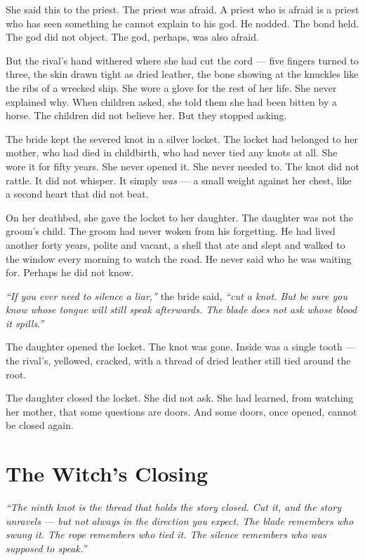 She said this to the priest. The priest was afraid. A priest who is afraid is a priest who has seen something he cannot explain to his god. He nodded. The bond held. The god did not object. The god, perhaps, was also afraid.

But the rival's hand withered where she had cut the cord — five fingers turned to three, the skin drawn tight as dried leather, the bone showing at the knuckles like the ribs of a wrecked ship. She wore a glove for the rest of her life. She never explained why. When children asked, she told them she had been bitten by a horse. The children did not believe her. But they stopped asking.

The bride kept the severed knot in a silver locket. The locket had belonged to her mother, who had died in childbirth, who had never tied any knots at all. She wore it for fifty years. She never opened it. She never needed to. The knot did not rattle. It did not whisper. It simply \textit{was} — a small weight against her chest, like a second heart that did not beat.

On her deathbed, she gave the locket to her daughter. The daughter was not the groom's child. The groom had never woken from his forgetting. He had lived another forty years, polite and vacant, a shell that ate and slept and walked to the window every morning to watch the road. He never said who he was waiting for. Perhaps he did not know.

\textit{``If you ever need to silence a liar,''} the bride said, \textit{``cut a knot. But be sure you know whose tongue will still speak afterwards. The blade does not ask whose blood it spills.''}

The daughter opened the locket. The knot was gone. Inside was a single tooth — the rival's, yellowed, cracked, with a thread of dried leather still tied around the root.

The daughter closed the locket. She did not ask. She had learned, from watching her mother, that some questions are doors. And some doors, once opened, cannot be closed again.

\section*{The Witch's Closing}

\textit{``The ninth knot is the thread that holds the story closed. Cut it, and the story unravels — but not always in the direction you expect. The blade remembers who swung it. The rope remembers who tied it. The silence remembers who was supposed to speak.''}


